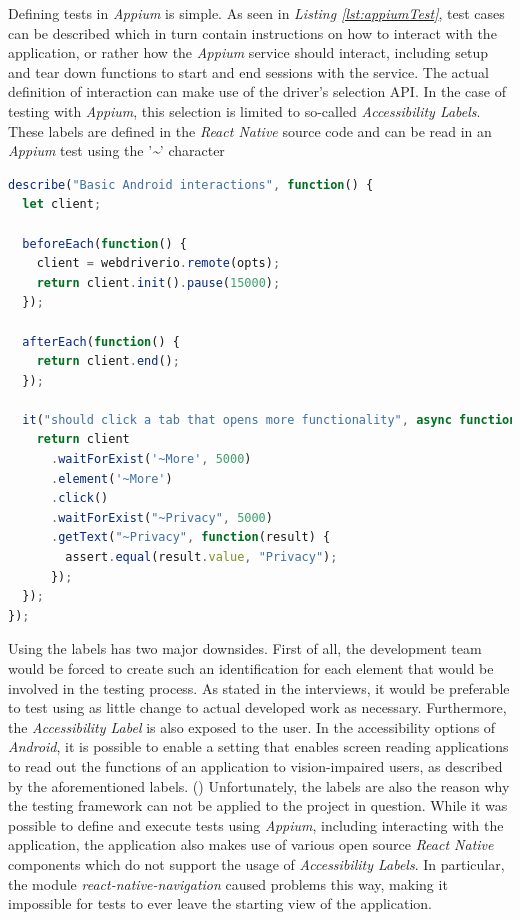 \newpage

Defining tests in \textit{Appium} is simple. As seen in \textit{Listing \ref{lst:appiumTest}}, test cases can be described which in turn contain instructions on how to interact with the application, or rather how the \textit{Appium} service should interact, including setup and tear down functions to start and end sessions with the service. The actual definition of interaction can make use of the driver's selection API. In the case of testing with \textit{Appium}, this selection is limited to so-called \textit{Accessibility Labels}. These labels are defined in the \textit{React Native} source code and can be read in an \textit{Appium} test using the '\textit{\~}' character

\begin{lstlisting}[language=javascript,caption=\textit{Appium WebdriverIO} Test Example,label=lst:appiumTest]
describe("Basic Android interactions", function() {
  let client;

  beforeEach(function() {
    client = webdriverio.remote(opts);
    return client.init().pause(15000);
  });

  afterEach(function() {
    return client.end();
  });

  it("should click a tab that opens more functionality", async function() {
    return client
      .waitForExist('~More', 5000)
      .element('~More')
      .click()
      .waitForExist("~Privacy", 5000)
      .getText("~Privacy", function(result) {
        assert.equal(result.value, "Privacy");
      });
  });
});
\end{lstlisting}

Using the labels has two major downsides. First of all, the development team would be forced to create such an identification for each element that would be involved in the testing process. As stated in the interviews, it would be preferable to test using as little change to actual developed work as necessary.
\newline
Furthermore, the \textit{Accessibility Label} is also exposed to the user. In the accessibility options of \textit{Android}, it is possible to enable a setting that enables screen reading applications to read out the functions of an application to vision-impaired users, as described by the aforementioned labels. (\cite{accessible-apps})
\newline
Unfortunately, the labels are also the reason why the testing framework can not be applied to the project in question. While it was possible to define and execute tests using \textit{Appium}, including interacting with the application, the application also makes use of various open source \textit{React Native} components which do not support the usage of \textit{Accessibility Labels}. In particular, the module \textit{react-native-navigation} caused problems this way, making it impossible for tests to ever leave the starting view of the application.

